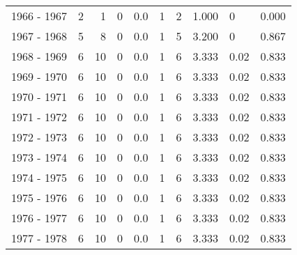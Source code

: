 \begin{tabular}{lrrrrrrrlr}
1966 - 1967 &        2 &        1 &                 0 &               0.0 &                       1 &                          2 &       1.000 &          0 &             0.000 \\
1967 - 1968 &        5 &        8 &                 0 &               0.0 &                       1 &                          5 &       3.200 &          0 &             0.867 \\
1968 - 1969 &        6 &       10 &                 0 &               0.0 &                       1 &                          6 &       3.333 &       0.02 &             0.833 \\
1969 - 1970 &        6 &       10 &                 0 &               0.0 &                       1 &                          6 &       3.333 &       0.02 &             0.833 \\
1970 - 1971 &        6 &       10 &                 0 &               0.0 &                       1 &                          6 &       3.333 &       0.02 &             0.833 \\
1971 - 1972 &        6 &       10 &                 0 &               0.0 &                       1 &                          6 &       3.333 &       0.02 &             0.833 \\
1972 - 1973 &        6 &       10 &                 0 &               0.0 &                       1 &                          6 &       3.333 &       0.02 &             0.833 \\
1973 - 1974 &        6 &       10 &                 0 &               0.0 &                       1 &                          6 &       3.333 &       0.02 &             0.833 \\
1974 - 1975 &        6 &       10 &                 0 &               0.0 &                       1 &                          6 &       3.333 &       0.02 &             0.833 \\
1975 - 1976 &        6 &       10 &                 0 &               0.0 &                       1 &                          6 &       3.333 &       0.02 &             0.833 \\
1976 - 1977 &        6 &       10 &                 0 &               0.0 &                       1 &                          6 &       3.333 &       0.02 &             0.833 \\
1977 - 1978 &        6 &       10 &                 0 &               0.0 &                       1 &                          6 &       3.333 &       0.02 &             0.833 \\

\end{tabular}
